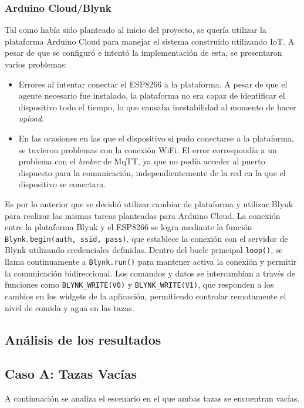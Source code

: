 \subsubsection{Arduino Cloud/Blynk}
Tal como había sido planteado al inicio del proyecto, se quería utilizar la plataforma Arduino Cloud para manejar el sistema construido utilizando IoT. A pesar de que se configuró e intentó la implementación de esta, se presentaron varios problemas:

\begin{itemize}
    \item Errores al intentar conectar el ESP8266 a la plataforma. A pesar de que el agente necesario fue instalado, la plataforma no era capaz de identificar el dispositivo todo el tiempo, lo que causaba inestabilidad al momento de hacer \textit{upload}.

    \item En las ocasiones en las que el dispositivo sí pudo conectarse a la plataforma, se tuvieron problemas con la conexión WiFi. El error correspondía a un problema con el \textit{broker} de  MqTT, ya que no podía acceder al puerto dispuesto para la comunicación, independientemente de la red en la que el dispositivo se conectara. 
\end{itemize}

Es por lo anterior que se decidió utilizar cambiar de plataforma y utilizar Blynk para realizar las mismas tareas planteadas para Arduino Cloud. La conexión entre la plataforma Blynk y el ESP8266 se logra mediante la función \texttt{Blynk.begin(auth, ssid, pass)}, que establece la conexión con el servidor de Blynk utilizando credenciales definidas. Dentro del bucle principal \texttt{loop()}, se llama continuamente a \texttt{Blynk.run()} para mantener activa la conexión y permitir la comunicación bidireccional. Los comandos y datos se intercambian a través de funciones como \texttt{BLYNK\_WRITE(V0)} y \texttt{BLYNK\_WRITE(V1)}, que responden a los cambios en los widgets de la aplicación, permitiendo controlar remotamente el nivel de comida y agua en las tazas.

\subsection{Análisis de los resultados}

\subsection{Caso A: Tazas Vacías}
A continuación se analiza el escenario en el que ambas tazas se encuentran vacías.


